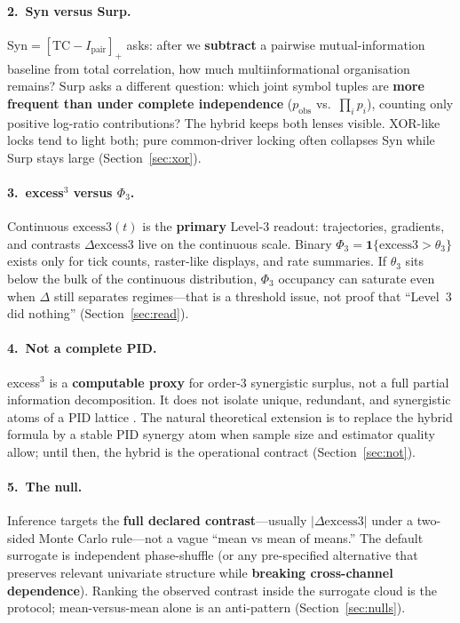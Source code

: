 \documentclass[11pt,a4paper]{article}
\begin{document}
\paragraph{2.\ Syn versus Surp.}
$\mathrm{Syn}=[\mathrm{TC}-I_{\mathrm{pair}}]_+$ asks: after we
\textbf{subtract} a pairwise mutual-information baseline from total
correlation, how much multiinformational organisation remains?
$\mathrm{Surp}$ asks a different question: which joint symbol tuples are
\textbf{more frequent than under complete independence}
($p_{\mathrm{obs}}$ vs.\ $\prod_i p_i$), counting only positive log-ratio
contributions? The hybrid keeps both lenses visible. XOR-like locks tend to
light both; pure common-driver locking often collapses Syn while Surp stays
large (Section~\ref{sec:xor}).

\paragraph{3.\ excess$^3$ versus $\Phi_3$.}
Continuous $\mathrm{excess3}(t)$ is the \textbf{primary} Level-3 readout:
trajectories, gradients, and contrasts $\Delta\mathrm{excess3}$ live on the
continuous scale. Binary
$\Phi_3=\mathbf{1}\{\mathrm{excess3}>\theta_3\}$ exists only for tick
counts, raster-like displays, and rate summaries. If $\theta_3$ sits below
the bulk of the continuous distribution, $\Phi_3$ occupancy can saturate
even when $\Delta$ still separates regimes---that is a threshold issue, not
proof that ``Level~3 did nothing'' (Section~\ref{sec:read}).

\paragraph{4.\ Not a complete PID.}
excess$^3$ is a \textbf{computable proxy} for order-3 synergistic surplus,
not a full partial information decomposition. It does not isolate unique,
redundant, and synergistic atoms of a PID lattice
\citep{Williams2010,Bertschinger2014}. The natural theoretical extension is
to replace the hybrid formula by a stable PID synergy atom when sample size
and estimator quality allow; until then, the hybrid is the operational
contract (Section~\ref{sec:not}).

\paragraph{5.\ The null.}
Inference targets the \textbf{full declared contrast}---usually
$|\Delta\mathrm{excess3}|$ under a two-sided Monte Carlo rule---not a vague
``mean vs mean of means.'' The default surrogate is independent
phase-shuffle (or any pre-specified alternative that preserves relevant
univariate structure while \textbf{breaking cross-channel dependence}).
Ranking the observed contrast inside the surrogate cloud is the protocol;
mean-versus-mean alone is an anti-pattern (Section~\ref{sec:nulls}).
\end{document}
